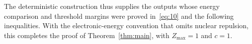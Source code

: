 The deterministic construction thus supplies the outputs whose energy
comparison and threshold margins were proved in~\eqref{eq:10} and the
following inequalities. With the electronic-energy convention that
omits nuclear repulsion, this completes the proof of
Theorem~\ref{thm:main}, with $Z_{\max}=1$ and $c=1$.
